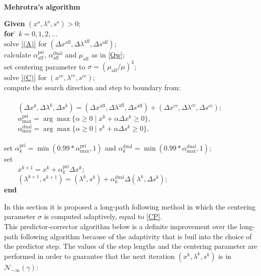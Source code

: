 \documentclass[a4paper,10 pt,titlepage,twoside]{book}
\theoremstyle{plain}
\theoremstyle{definition}
\theoremstyle{remark}
\begin{document}
\newpage
\\
\textbf{Mehrotra's algorithm}
\begin{tabbing}
	\textbf{Given} $(x^{o}, \lambda^{o}, s^{o})> 0$; \\
	\textbf{for} \= $k = 0, 1, 2,...$ \\
	\> solve \ref{(A)} for $(\Delta x^{\text{aff}},\Delta \lambda^{\text{aff}},\Delta s^{\text{aff}})$;\\
	\> calculate $\alpha_{\text{aff}}^{\text{pri}}$, $\alpha_{\text{aff}}^{\text{dual}}$ and $\mu_{\text{aff}}$ as in \ref{Qw};\\
	\> set centering parameter to $\sigma = (\mu_{\text{aff}}/\mu)^{3}$; \\
	\> solve \ref{(C)} for $(x^{cc},\lambda^{cc},s^{cc})$;\\
	\> compute the search direction and step to boundary from: \\
	\> \\
	\> $\;\;\;\;\;\;\;(\Delta x^{k},\Delta \lambda^{k},\Delta s^{k})=(\Delta x^{\text{aff}},\Delta \lambda^{\text{aff}},\Delta s^{\text{aff}})+(\Delta x^{cc},\Delta  \lambda^{cc},\Delta s^{cc})$;\\
	\> $\;\;\;\;\;\;\;\alpha_{\text{max}}^{\text{pri}}=\arg\max\{\alpha\geq0\;|\;x^{k} +\alpha\Delta x^{k}\geq 0\}$,\\
	\> $\;\;\;\;\;\;\;\alpha_{\text{max}}^{\text{dual}}=\arg\max\{\alpha\geq0\;|\;s^{k} +\alpha\Delta s^{k}\geq 0\}$,\\
	\>\\
	\> set $\alpha_{k}^{\text{pri}}=\min(0.99\ast\alpha_{\text{max}}^{\text{pri}},1)$ and $\alpha_{k}^{\text{dual}}=\min(0.99\ast\alpha_{\text{max}}^{\text{dual}},1)$;\\
	\> set\\
	\> $\;\;\;\;\;\;\;x^{k+1} = x^{k} + \alpha_{k}^{\text{pri}}\Delta x^{k}$;\\
	\>$\;\;\;\;\;\;\;(\lambda^{k+1},s^{k+1}) = (\lambda^{k},s^{k}) + \alpha_{k}^{\text{dual}}\Delta (\lambda^{k},\Delta s^{k})$;\\
\textbf{end}
\end{tabbing}
In this section it is proposed a long-path following method in which the centering parameter $\sigma$ is computed adaptively, equal to \ref{CP}.\\
This predictor-corrector algorithm below is a definite improvement over the long-path following algorithm because of the adaptivity that is buil into the choice of the predictor step.
The values of the step lengths and the centering parameter are performed in order to guarantee that the next iteration $(x^{k}, \lambda^{k}, s^{k})$ is in $\mathcal{N}_{-\infty}(\gamma)$:
\end{document}
